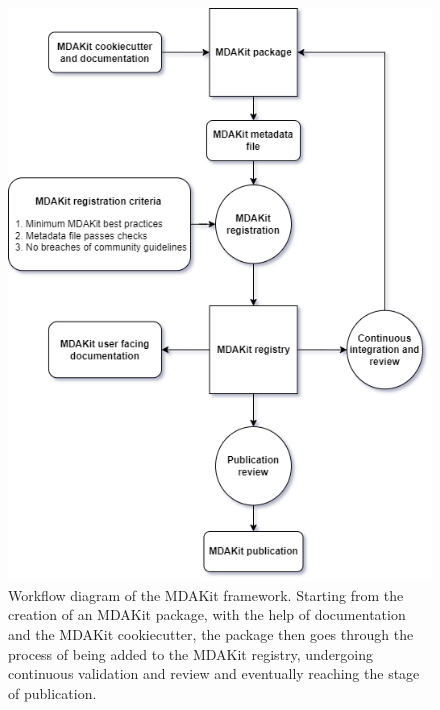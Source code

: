 \documentclass[9pt,whitepaper]{livecoms}
\begin{document}
\begin{figure}[hbt!]
    \centering
    \includegraphics[width=\linewidth]{figures/MDAKitFramework.png}
    \caption{Workflow diagram of the MDAKit framework. Starting from the creation of an MDAKit package, with the help of documentation and the MDAKit cookiecutter, the package then goes through the process of being added to the MDAKit registry, undergoing continuous validation and review and eventually reaching the stage of publication.}
    \label{fig:workflow}
\end{figure}
\end{document}
